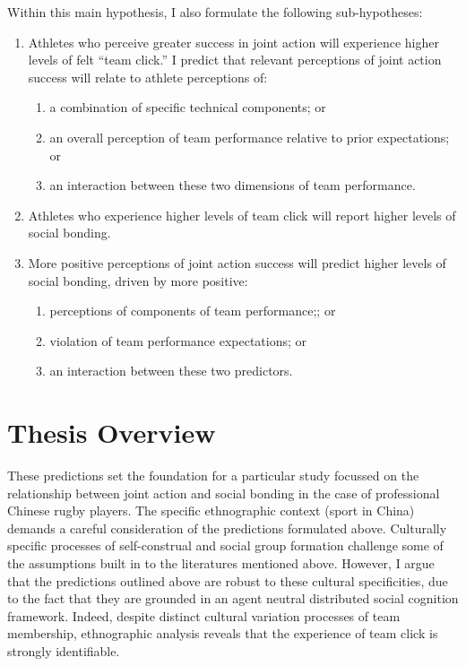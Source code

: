 \begin{CJK}{UTF8}{gbsn}
    Within this main hypothesis, I also formulate the following sub-hypotheses:
    \begin{enumerate}
      \item Athletes who perceive greater success in joint action will experience higher levels of felt ``team click.'' I predict that relevant perceptions of joint action success will relate to athlete perceptions of:
        \begin{enumerate}
          \item a combination of specific technical components; or
          \item an overall perception of team performance relative to prior expectations; or
          \item an interaction between these two dimensions of team performance.
        \end{enumerate}
      \item Athletes who experience higher levels of team click will report higher levels of social bonding.
      \item More positive perceptions of joint action success will predict higher levels of social bonding, driven by more positive:
      \begin{enumerate}
        \item perceptions of components of team performance;; or
        \item violation of team performance expectations; or
        \item an interaction between these two predictors.
      \end{enumerate}
    \end{enumerate}


\section{Thesis Overview}

These predictions set the foundation for a particular study focussed on the relationship between joint action and social bonding in the case of professional Chinese rugby players. The specific ethnographic context (sport in China) demands a careful consideration of the predictions formulated above.  Culturally specific processes of self-construal and social group formation challenge some of the assumptions built in to the literatures mentioned above.  However, I argue that the predictions outlined above are robust to these cultural specificities, due to the fact that they are grounded in an agent neutral distributed social cognition framework. Indeed, despite distinct cultural variation processes of team membership, ethnographic analysis reveals that the experience of team click is strongly identifiable.


\end{CJK}
